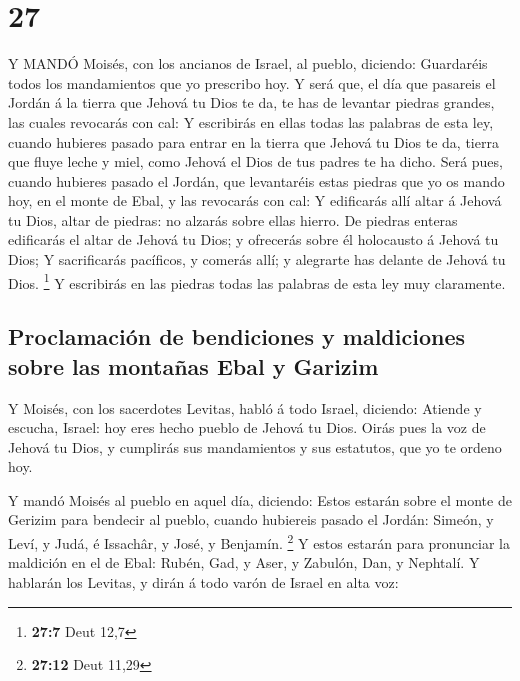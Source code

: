 \hypertarget{section-26}{%
\section{27}\label{section-26}}

 Y MANDÓ Moisés, con los ancianos de Israel, al pueblo,
diciendo: Guardaréis todos los mandamientos que yo prescribo hoy.
 Y será que, el día que pasareis el Jordán á la tierra que
Jehová tu Dios te da, te has de levantar piedras grandes, las cuales
revocarás con cal:  Y escribirás en ellas todas las palabras
de esta ley, cuando hubieres pasado para entrar en la tierra que Jehová
tu Dios te da, tierra que fluye leche y miel, como Jehová el Dios de tus
padres te ha dicho.  Será pues, cuando hubieres pasado el
Jordán, que levantaréis estas piedras que yo os mando hoy, en el monte
de Ebal, y las revocarás con cal:  Y edificarás allí altar á
Jehová tu Dios, altar de piedras: no alzarás sobre ellas hierro.
 De piedras enteras edificarás el altar de Jehová tu Dios; y
ofrecerás sobre él holocausto á Jehová tu Dios;  Y
sacrificarás pacíficos, y comerás allí; y alegrarte has delante de
Jehová tu Dios. \footnote{\textbf{27:7} Deut 12,7}  Y
escribirás en las piedras todas las palabras de esta ley muy claramente.

\hypertarget{proclamaciuxf3n-de-bendiciones-y-maldiciones-sobre-las-montauxf1as-ebal-y-garizim}{%
\subsection{Proclamación de bendiciones y maldiciones sobre las montañas
Ebal y
Garizim}\label{proclamaciuxf3n-de-bendiciones-y-maldiciones-sobre-las-montauxf1as-ebal-y-garizim}}

 Y Moisés, con los sacerdotes Levitas, habló á todo Israel,
diciendo: Atiende y escucha, Israel: hoy eres hecho pueblo de Jehová tu
Dios.  Oirás pues la voz de Jehová tu Dios, y cumplirás sus
mandamientos y sus estatutos, que yo te ordeno hoy.

 Y mandó Moisés al pueblo en aquel día, diciendo:
 Estos estarán sobre el monte de Gerizim para bendecir al
pueblo, cuando hubiereis pasado el Jordán: Simeón, y Leví, y Judá, é
Issachâr, y José, y Benjamín. \footnote{\textbf{27:12} Deut 11,29}
 Y estos estarán para pronunciar la maldición en el de
Ebal: Rubén, Gad, y Aser, y Zabulón, Dan, y Nephtalí.  Y
hablarán los Levitas, y dirán á todo varón de Israel en alta voz:


